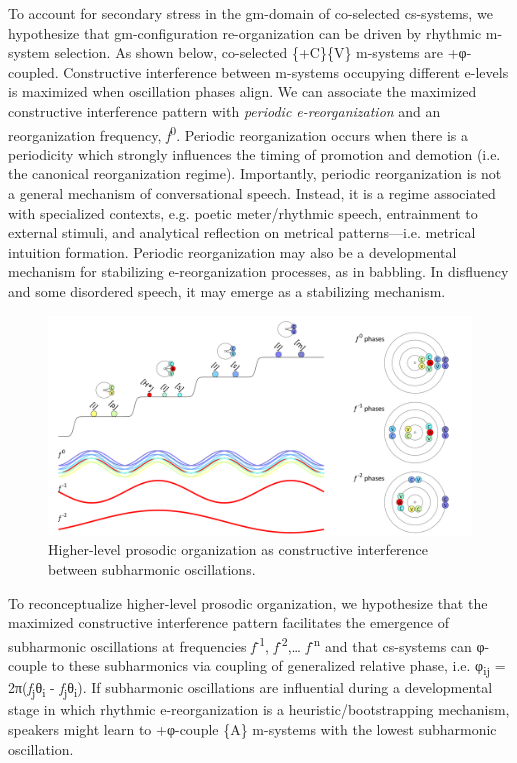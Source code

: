   To account for secondary stress in the gm-domain of co-selected cs-systems, we hypothesize that gm-configuration re-organization can be driven by rhythmic m-system selection. As shown below, co-selected \{+C\}\{V\} m-systems are +φ-coupled. Constructive interference between m-systems occupying different e-levels is maximized when oscillation phases align. We can associate the maximized constructive interference pattern with \textit{periodic e-reorganization} and an reorganization frequency, \textit{f}\textsuperscript{0}. Periodic reorganization occurs when there is a periodicity which strongly influences the timing of promotion and demotion (i.e. the canonical reorganization regime). Importantly, periodic reorganization is not a general mechanism of conversational speech. Instead, it is a regime associated with specialized contexts, e.g. poetic meter/rhythmic speech, entrainment to external stimuli, and analytical reflection on metrical patterns—i.e. metrical intuition formation. Periodic reorganization may also be a developmental mechanism for stabilizing e-reorganization processes, as in babbling. In disfluency and some disordered speech, it may emerge as a stabilizing mechanism.

  
\begin{figure}
\includegraphics[width=\textwidth]{figures/Tilsen-img64.png}
\caption{Higher-level prosodic organization as constructive interference between subharmonic oscillations.}
\label{fig:4:14}
\end{figure}
 

  To reconceptualize higher-level prosodic organization, we hypothesize that the maximized constructive interference pattern facilitates the emergence of subharmonic oscillations at frequencies \textit{f}\textsuperscript{{}-1}, \textit{f}\textsuperscript{{}-2},… \textit{f}\textsuperscript{{}-n} and that cs-systems can φ-couple to these subharmonics via coupling of generalized relative phase, i.e. φ\textsubscript{ij} = 2π(\textit{f}\textsubscript{j}θ\textsubscript{i} - \textit{f}\textsubscript{j}θ\textsubscript{i}). If subharmonic oscillations are influential during a developmental stage in which rhythmic e-reorganization is a heuristic/bootstrapping mechanism, speakers might learn to +φ-couple \{A\} m-systems with the lowest subharmonic oscillation.

